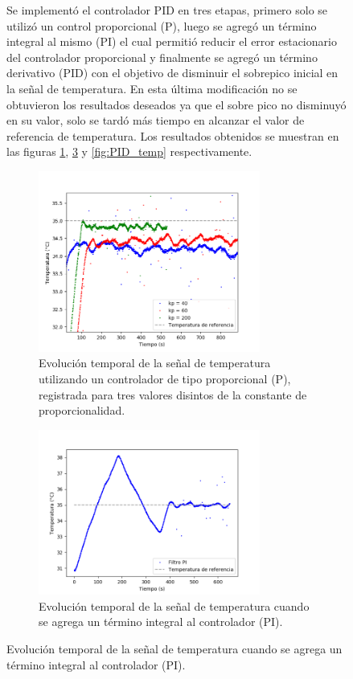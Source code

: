 \documentclass[a4paper,11pt]{article}
\begin{document}
\begin{figure}[!ht]
Se implementó el controlador PID en tres etapas, primero solo se utilizó
un control proporcional (P), luego se agregó un término integral al
mismo (PI) el cual permitió reducir el error estacionario del controlador
proporcional y finalmente se agregó un término derivativo (PID) con el
objetivo de disminuir el sobrepico inicial en la señal de temperatura.
En esta última modificación no se obtuvieron los resultados deseados ya
que el sobre pico no disminuyó en su valor, solo se tardó más tiempo en
alcanzar el valor de referencia de temperatura.
Los resultados obtenidos se muestran en las figuras \ref{fig:P_temp},
\ref{fig:PI_temp} y \ref{fig:PID_temp} respectivamente.

\begin{figure}[!ht]
\centering
\includegraphics[width=0.8\textwidth]{figs/P_temp}
\caption{Evolución temporal de la señal de temperatura utilizando
un controlador de tipo proporcional (P), registrada para tres valores
disintos de la constante de proporcionalidad.}
\label{fig:P_temp}
\end{figure}

\begin{figure}[!ht]
\centering
\includegraphics[width=0.8\textwidth]{figs/PI_temp}
\caption{Evolución temporal de la señal de temperatura cuando se agrega
un término integral al controlador (PI).}
\label{fig:PI_temp}
\end{figure}


\end{figure}
\end{document}
